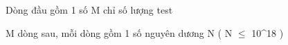 Dòng đầu gồm 1 số M chỉ số lượng test

M dòng sau, mỗi dòng gồm 1 số nguyên dương N ( N  $\le$  10^18 )

\